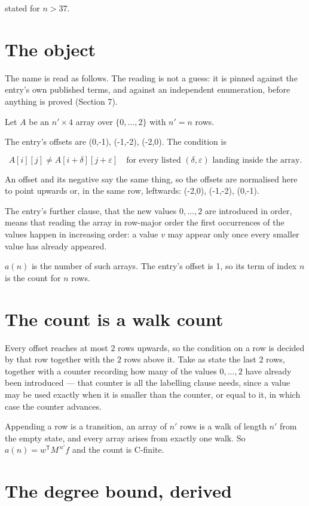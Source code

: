\documentclass[11pt]{article}
\theoremstyle{definition}
\begin{document}
stated for $n > 37$.

\section{The object}

The name is read as follows. The reading is not a guess: it is pinned against the entry's own published terms, and against an independent enumeration, before anything is proved (Section 7).

Let $A$ be an $n' \times 4$ array over $\{0,\dots,2\}$ with $n' = n$ rows.

The entry's offsets are (0,-1), (-1,-2), (-2,0). The condition is

\[A[i][j] \ne A[i{+}\delta][j{+}\varepsilon]\quad\text{for every listed }(\delta,\varepsilon)\text{ landing inside the array.}\]

An offset and its negative say the same thing, so the offsets are normalised here to point upwards or, in the same row, leftwards: (-2,0), (-1,-2), (0,-1).

The entry's further clause, that the new values $0,\dots,2$ are introduced in order, means that reading the array in row-major order the first occurrences of the values happen in increasing order: a value $v$ may appear only once every smaller value has already appeared.

$a(n)$ is the number of such arrays. The entry's offset is 1, so its term of index $n$ is the count for $n$ rows.

\section{The count is a walk count}

Every offset reaches at most $2$ rows upwards, so the condition on a row is decided by that row together with the $2$ rows above it. Take as state the last $2$ rows, together with a counter recording how many of the values $0,\dots,2$ have already been introduced --- that counter is all the labelling clause needs, since a value may be used exactly when it is smaller than the counter, or equal to it, in which case the counter advances.

Appending a row is a transition, an array of $n'$ rows is a walk of length $n'$ from the empty state, and every array arises from exactly one walk. So $a(n) = w^{\mathsf T}M^{\,n'}f$ and the count is C-finite.

\section{The degree bound, derived}
\end{document}
